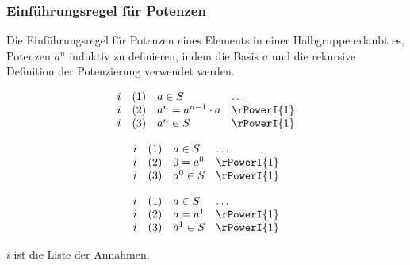 \documentclass{book}
\theoremstyle{plain}
\theoremstyle{remark}
\theoremstyle{definition}
\begin{document}
\subsubsection*{Einführungsregel für Potenzen}
\label{rule:rPowerI}
Die Einführungsregel für Potenzen eines Elements in einer Halbgruppe erlaubt es, Potenzen \(a^n\) induktiv zu definieren, indem die Basis \(a\) und die rekursive Definition der Potenzierung verwendet werden.

\[
\begin{array}{llll}
    i   & (1) & a \in S & \dots \\
    i   & (2) & a^n = a^{n-1} \cdot a & \rPowerI{1} \\
    i   & (3) & a^n\in S & \rPowerI{1} \\
\end{array}
\]

\[
\begin{array}{llll}
    i   & (1) & a \in S & \dots \\
    i   & (2) & 0 = a^{0} & \rPowerI{1} \\
    i   & (3) & a^{0}\in S & \rPowerI{1} \\
\end{array}
\]

\[
\begin{array}{llll}
    i   & (1) & a \in S & \dots \\
    i   & (2) & a = a^{1} & \rPowerI{1} \\
    i   & (3) & a^{1}\in S & \rPowerI{1} \\
\end{array}
\]

\(i\) ist die Liste der Annahmen.
\end{document}

